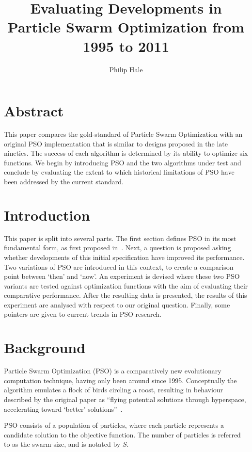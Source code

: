 \documentclass{csfourzero}
\author{Philip Hale}
\title{Evaluating Developments in Particle Swarm Optimization from
1995 to 2011}
\begin{document}
\maketitle

\section{Abstract}

This paper compares the gold-standard of Particle Swarm Optimization with an
original PSO implementation that is similar to designs proposed in the late
nineties.  The success of each algorithm is determined by its ability to
optimize six functions. We begin by introducing PSO and the two algorithms under
test and conclude by evaluating the extent to which historical limitations of
PSO have been addressed by the current standard.

\section{Introduction}

This paper is split into several parts. The first section defines PSO in its
most fundamental form, as first proposed in~\cite{Kennedy:1995bi}. Next, a
question is proposed asking whether developments of this initial specification
have improved its performance. Two variations of PSO are introduced in this
context, to create a comparison point between `then' and `now'. An experiment
is devised where these two PSO variants are tested against optimization
functions with the aim of evaluating their comparative performance. After the
resulting data is presented, the results of this experiment are analysed with
respect to our original question. Finally, some pointers are given to current
trends in PSO research.

\section{Background}

Particle Swarm Optimization (PSO) is a comparatively new evolutionary
computation technique, having only been around since 1995.  Conceptually the
algorithm emulates a flock of birds circling a roost, resulting in  behaviour
described by the original paper as ``flying potential solutions through
hyperspace, accelerating toward `better' solutions''~\cite{Kennedy:1995bi}.

PSO consists of a population of particles, where each particle represents a
candidate solution to the objective function.  The number of particles is
referred to as the swarm-size, and is notated by $S$.
\end{document}
